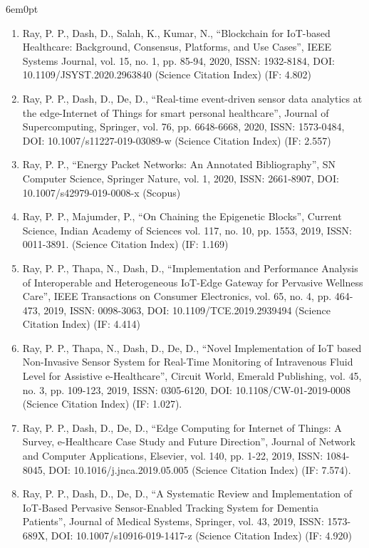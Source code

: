 \documentclass[11pt,a4paper]{moderncv}
\begin{document}
\begin{adjustwidth}{6em}{0pt}
\begin{enumerate}
		\item Ray, P. P., Dash, D., Salah, K., Kumar, N., “Blockchain for IoT-based Healthcare: Background, Consensus, Platforms, and Use Cases”, IEEE Systems Journal, vol. 15, no. 1, pp. 85-94, 2020, ISSN: 1932-8184, DOI: 10.1109/JSYST.2020.2963840 (Science Citation Index) (IF: 4.802) 
		
		\item Ray, P. P., Dash, D., De, D., “Real-time event-driven sensor data analytics at the edge-Internet of Things for smart personal healthcare”, Journal of Supercomputing, Springer, vol. 76, pp. 6648-6668, 2020, ISSN: 1573-0484, DOI: 10.1007/s11227-019-03089-w (Science Citation Index) (IF: 2.557) 
		
		\item Ray, P. P., “Energy Packet Networks: An Annotated Bibliography”, SN Computer Science, Springer Nature, vol. 1, 2020, ISSN: 2661-8907, DOI: 10.1007/s42979-019-0008-x (Scopus)
		
		\item Ray, P. P., Majumder, P., “On Chaining the Epigenetic Blocks”, Current Science, Indian Academy of Sciences vol. 117, no. 10, pp. 1553, 2019, ISSN: 0011-3891. (Science Citation Index) (IF: 1.169)
		
		\item Ray, P. P., Thapa, N., Dash, D., “Implementation and Performance Analysis of Interoperable and Heterogeneous IoT-Edge Gateway for Pervasive Wellness Care”, IEEE Transactions on Consumer Electronics, vol. 65, no. 4, pp. 464-473, 2019, ISSN: 0098-3063, DOI: 10.1109/TCE.2019.2939494 (Science Citation Index) (IF: 4.414) 
		
		\item 	Ray, P. P., Thapa, N., Dash, D., De, D., “Novel Implementation of IoT based Non-Invasive Sensor System for Real-Time Monitoring of Intravenous Fluid Level for Assistive e-Healthcare”, Circuit World, Emerald Publishing, vol. 45, no. 3, pp. 109-123, 2019, ISSN: 0305-6120, DOI: 10.1108/CW-01-2019-0008 (Science Citation Index) (IF: 1.027). 
		
		\item Ray, P. P., Dash, D., De, D., “Edge Computing for Internet of Things: A Survey, e-Healthcare Case Study and Future Direction”, Journal of Network and Computer Applications, Elsevier, vol. 140, pp. 1-22, 2019, ISSN: 1084-8045, DOI: 10.1016/j.jnca.2019.05.005 (Science Citation Index) (IF: 7.574). 
		
		\item Ray, P. P., Dash, D., De, D., “A Systematic Review and Implementation of IoT-Based Pervasive Sensor-Enabled Tracking System for Dementia Patients”, Journal of Medical Systems, Springer, vol. 43, 2019, ISSN: 1573-689X, DOI: 10.1007/s10916-019-1417-z (Science Citation Index) (IF: 4.920) 
		

\end{enumerate}
\end{adjustwidth}
\end{document}
